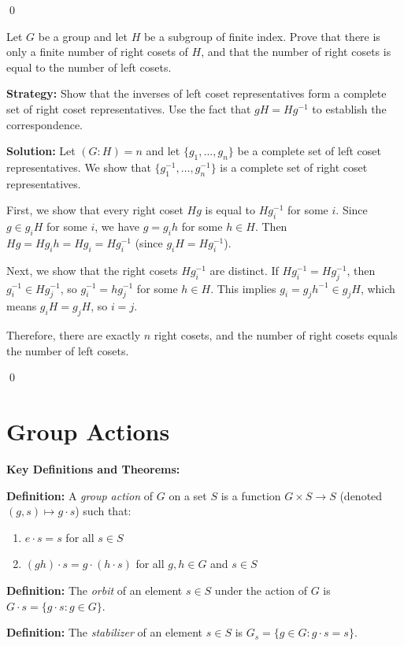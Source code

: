 \qed
\begin{problembox}
Let $G$ be a group and let $H$ be a subgroup of finite index. Prove that there is only a finite number of right cosets of $H$, and that the number of right cosets is equal to the number of left cosets.
\end{problembox}

\noindent\textbf{Strategy:} Show that the inverses of left coset representatives form a complete set of right coset representatives. Use the fact that $gH = Hg^{-1}$ to establish the correspondence.

\noindent\textbf{Solution:} Let $(G : H) = n$ and let $\{g_1, \ldots, g_n\}$ be a complete set of left coset representatives. We show that $\{g_1^{-1}, \ldots, g_n^{-1}\}$ is a complete set of right coset representatives.

First, we show that every right coset $Hg$ is equal to $Hg_i^{-1}$ for some $i$. Since $g \in g_iH$ for some $i$, we have $g = g_ih$ for some $h \in H$. Then $Hg = Hg_ih = Hg_i = Hg_i^{-1}$ (since $g_iH = Hg_i^{-1}$).

Next, we show that the right cosets $Hg_i^{-1}$ are distinct. If $Hg_i^{-1} = Hg_j^{-1}$, then $g_i^{-1} \in Hg_j^{-1}$, so $g_i^{-1} = hg_j^{-1}$ for some $h \in H$. This implies $g_i = g_jh^{-1} \in g_jH$, which means $g_iH = g_jH$, so $i = j$.

Therefore, there are exactly $n$ right cosets, and the number of right cosets equals the number of left cosets.


\qed
\section{Group Actions}

\textbf{Key Definitions and Theorems:}

\textbf{Definition:} A \textit{group action} of $G$ on a set $S$ is a function $G \times S \to S$ (denoted $(g,s) \mapsto g \cdot s$) such that:
\begin{enumerate}
\item $e \cdot s = s$ for all $s \in S$
\item $(gh) \cdot s = g \cdot (h \cdot s)$ for all $g, h \in G$ and $s \in S$
\end{enumerate}

\textbf{Definition:} The \textit{orbit} of an element $s \in S$ under the action of $G$ is $G \cdot s = \{g \cdot s : g \in G\}$.

\textbf{Definition:} The \textit{stabilizer} of an element $s \in S$ is $G_s = \{g \in G : g \cdot s = s\}$.

